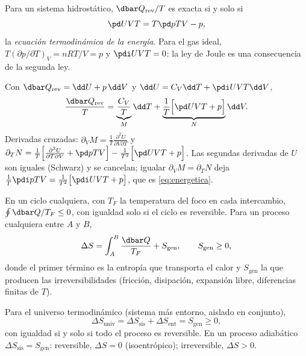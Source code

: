 \begin{proposicion}
Para un sistema hidrostático, $\dbar Q_{\mathrm{rev}}/T$ es exacta si y solo si
\begin{equation}\label{eq:energetica}
  \pd UVT=T\pd pTV-p,
\end{equation}
la \emph{ecuación termodinámica de la energía}. Para el gas ideal, $T(\partial p/\partial T)_V=nRT/V=p$ y
$\pdi UVT=0$: la ley de Joule es una consecuencia de la segunda ley.
\end{proposicion}

\begin{demostracion}
Con $\dbar Q_{\mathrm{rev}}=\dd U+p\,\dd V$ y $\dd U=C_V\dd T+\pdi UVT\dd V$,
\[
  \frac{\dbar Q_{\mathrm{rev}}}{T}=\underbrace{\frac{C_V}{T}}_{M}\dd T+\underbrace{\frac1T\Bigl[\pd UVT+p\Bigr]}_{N}\dd V .
\]
Derivadas cruzadas: $\partial_VM=\frac1T\frac{\partial^2U}{\partial V\partial T}$ y
$\partial_TN=\frac1T\Bigl[\frac{\partial^2U}{\partial T\partial V}+\pd pTV\Bigr]-\frac{1}{T^2}\Bigl[\pd UVT+p\Bigr]$.
Las segundas derivadas de $U$ son iguales (Schwarz) y se cancelan; igualar $\partial_VM=\partial_TN$ deja
$\frac1T\pdi pTV=\frac1{T^2}\bigl[\pdi UVT+p\bigr]$, que es \eqref{eq:energetica}.
\end{demostracion}

\begin{teorema}
En un ciclo cualquiera, con $T_F$ la temperatura del foco en cada intercambio, $\oint\dbar Q/T_F\leq0$, con
igualdad solo si el ciclo es reversible. Para un proceso cualquiera entre $A$ y $B$,
\begin{equation}\label{eq:balance}
  \Delta S=\int_A^B\frac{\dbar Q}{T_F}+S_{\mathrm{gen}},\qquad S_{\mathrm{gen}}\geq0,
\end{equation}
donde el primer término es la entropía que transporta el calor y $S_{\mathrm{gen}}$ la que producen las
irreversibilidades (fricción, disipación, expansión libre, diferencias finitas de $T$).
\end{teorema}

\begin{proposicion}
Para el universo termodinámico (sistema más entorno, aislado en conjunto),
\begin{equation}\label{eq:universo}
  \Delta S_{\mathrm{univ}}=\Delta S_{\mathrm{sis}}+\Delta S_{\mathrm{ent}}=S_{\mathrm{gen}}\geq0,
\end{equation}
con igualdad si y solo si todo el proceso es reversible. En un proceso adiabático $\Delta S_{\mathrm{sis}}=S_{\mathrm{gen}}$:
reversible, $\Delta S=0$ (isoentrópico); irreversible, $\Delta S>0$.
\end{proposicion}

